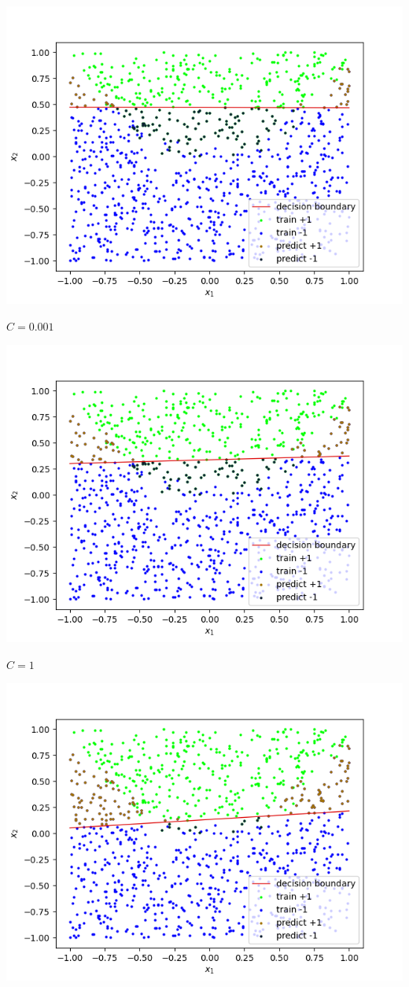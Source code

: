 \documentclass[12pt]{article}
\begin{document}
\begin{center}
    
    \includegraphics[scale=0.7]{fig_3.png}
    
    $C = 0.001$
    
    \includegraphics[scale=0.7]{fig_4.png}
    
    $C = 1$
    
    \includegraphics[scale=0.7]{fig_5.png}
    

\end{center}
\end{document}
